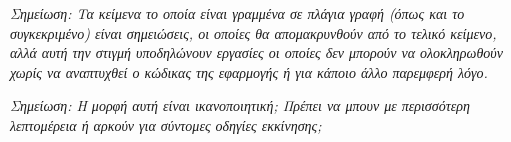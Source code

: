 \documentclass[a4paper,titlepage,twoside,12pt,leqno]{article}
\begin{document}
\emph{Σημείωση: Τα κείμενα το οποία είναι γραμμένα σε πλάγια γραφή (όπως και το συγκεκριμένο) είναι σημειώσεις, οι οποίες θα απομακρυνθούν από το τελικό κείμενο, αλλά αυτή την στιγμή υποδηλώνουν εργασίες οι οποίες δεν μπορούν να ολοκληρωθούν χωρίς να αναπτυχθεί ο κώδικας της εφαρμογής ή για κάποιο άλλο παρεμφερή λόγο.}

\emph{Σημείωση: Η μορφή αυτή είναι ικανοποιητική; Πρέπει να μπουν με περισσότερη λεπτομέρεια ή αρκούν για σύντομες οδηγίες εκκίνησης;}
\end{document}
